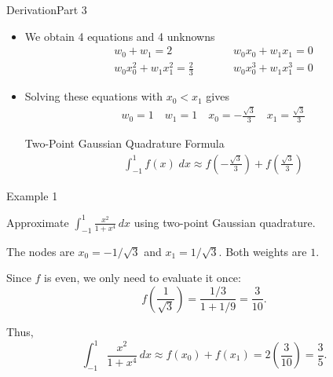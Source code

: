 \documentclass[10pt]{beamer}
\begin{document}
\begin{frame}{Derivation}{Part 3}
\begin{itemize}
    \item We obtain 4 equations and 4 unknowns
    \begin{eqnarray*}
      w_0 + w_1 = 2 &\qquad&
      w_0x_0 + w_1x_1 =  0 \\
      w_0x_0^2 + w_1x_1^2  = \frac{2}{3} &\qquad&
      w_0x_0^3 + w_1x_1^3 =  0
    \end{eqnarray*}
    \item Solving these equations with $x_0<x_1$ gives
\begin{eqnarray*}
  w_0 = 1 \quad w_1 = 1 \quad x_0 = -\frac{\sqrt{3}}{3}
         \quad x_1 = \frac{\sqrt{3}}{3}
\end{eqnarray*}
\begin{block}{Two-Point Gaussian Quadrature Formula}
\begin{eqnarray*}
  \int_{-1}^1 f(x) \; \mathit{dx} \approx f\left(-\frac{\sqrt{3}}{3}
  \right) + f\left(\frac{\sqrt{3}}{3} \right)
\end{eqnarray*}
\end{block}
\end{itemize}
\end{frame}

\begin{frame}{Example 1}
\begin{example}
Approximate $\displaystyle \int_{-1}^{1} \frac{x^2}{1+x^4}\,dx$
using two-point Gaussian quadrature.
\end{example}

The nodes are $x_0=-1/\sqrt{3}$ and $x_1=1/\sqrt{3}$.
Both weights are $1$.

Since $f$ is even, we only need to evaluate it once:
\[
    f\left(\frac{1}{\sqrt{3}}\right)
    = \frac{1/3}{1+1/9}
    = \frac{3}{10}.
\]

Thus,
\[
    \int_{-1}^{1} \frac{x^2}{1+x^4}\,dx
    \approx f(x_0)+f(x_1)
    = 2\left(\frac{3}{10}\right)
    = \boxed{\frac{3}{5}}.
\]
\end{frame}
\end{document}
